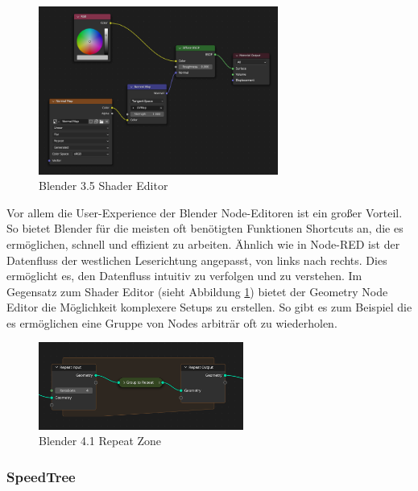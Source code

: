 \documentclass[ngerman]{article}
\begin{document}
\begin{figure}[htbp]
  \centering
  \includegraphics[width=0.7\textwidth]{./graphics/blender-shader.png}
  \caption{Blender 3.5 Shader Editor}
  \label{fig:blender-shader}
\end{figure}

Vor allem die User-Experience der Blender Node-Editoren ist ein großer Vorteil. So bietet Blender für die meisten oft benötigten Funktionen Shortcuts an, die es ermöglichen, schnell und effizient zu arbeiten.
Ähnlich wie in Node-RED ist der Datenfluss der westlichen Leserichtung angepasst, von links nach rechts. Dies ermöglicht es, den Datenfluss intuitiv zu verfolgen und zu verstehen.
\br
Im Gegensatz zum Shader Editor (sieht Abbildung \ref{fig:blender-shader}) bietet der Geometry Node Editor die Möglichkeit komplexere Setups zu erstellen. So gibt es zum Beispiel   die es ermöglichen eine Gruppe von Nodes arbiträr oft zu wiederholen.

\begin{figure}[htbp]
  \centering
  \includegraphics[width=0.6\textwidth]{./graphics/modeling_geometry-nodes_repeat_zone.png}
  \caption{Blender 4.1 Repeat Zone}
  \label{fig:blender-repeat}
\end{figure}

\subsubsection{SpeedTree}
\end{document}
